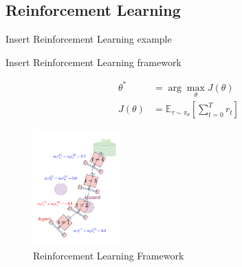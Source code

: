 \documentclass[8pt, aspectratio=169]{beamer} %
\begin{document}

\subsection{Reinforcement Learning}

\begin{frame}{\insertsubsectionhead}

  Insert Reinforcement Learning example

\end{frame}

\begin{frame}{\insertsubsectionhead}

  Insert Reinforcement Learning framework

\end{frame}

\begin{frame}{\insertsubsectionhead}

  \begin{equation}
    \begin{aligned}
      \theta^* &= \arg\max_\theta J(\theta) \\
      J(\theta) &= \mathbb{E}_{\tau \sim \pi_\theta} \left[\sum^T_{t = 0} r_t \right]
    \end{aligned}
  \end{equation}

\end{frame}

\begin{frame}{\insertsubsectionhead}

  \begin{figure}
    \includegraphics[width=0.3\textwidth]{figures/rl.pdf}
    \caption{Reinforcement Learning Framework}
  \end{figure}

\end{frame}
\end{document}
